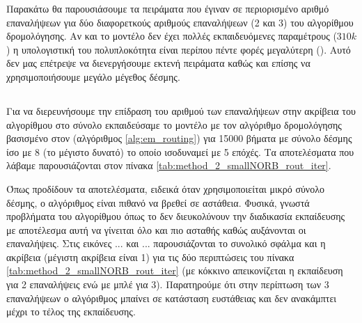 Παρακάτω θα παρουσιάσουμε τα πειράματα που έγιναν σε περιορισμένο αριθμό επαναλήψεων για δύο διαφορετκούς αριθμούς επαναλήψεων (2 και 3) του αλγορίθμου δρομολόγησης. Αν και το μοντέλο δεν έχει πολλές εκπαιδευόμενες παραμέτρους ($310k$) η υπολογιστική του πολυπλοκότητα είναι περίπου πέντε φορές μεγαλύτερη (). Αυτό δεν μας επέτρεψε να διενεργήσουμε εκτενή πειράματα καθώς και επίσης να χρησιμοποιήσουμε μεγάλο μέγεθος δέσμης.

\subsection{}
Για να διερευνήσουμε την επίδραση του αριθμού των επαναλήψεων στην ακρίβεια του αλγορίθμου στο σύνολο  εκπαιδεύσαμε το μοντέλο με τον αλγόριθμο δρομολόγησης βασισμένο στον  (αλγόριθμος \ref{alg:em_routing}) για 15000 βήματα με σύνολο δέσμης ίσο με 8 (το μέγιστο δυνατό) το οποίο ισοδυναμεί με 5 επόχές. Τα αποτελέσματα που λάβαμε παρουσιάζονται στον πίνακα \ref{tab:method_2_smallNORB_rout_iter}.
\begin{table}[h]
    \begin{center}
    \end{center}
    \caption[]{\label{tab:method_2_smallNORB_rout_iter}Πίνακας στον οποίο φαίνεται η επίδραση του αριθμού των επαναλήψεων στην ακρίβεια όπως μετράται από το σύνολο ελέγχου , όταν χρησιμοποιούνται πολύ λίγες εποχές για την εκπαίδευση του μοντέλου.} 
\end{table}

Όπως προδίδουν τα αποτελέσματα, ειδεικά όταν χρησιμοποιείται μικρό σύνολο δέσμης, ο αλγόριθμος είναι πιθανό να βρεθεί σε αστάθεια. Φυσικά, γνωστά προβλήματα του αλγορίθμου  όπως το  δεν διευκολύνουν την διαδικασία εκπαίδευσης με αποτέλεσμα αυτή να γίνειται όλο και πιο ασταθής καθώς αυξάνονται οι επαναλήψεις. Στις εικόνες ... και ... παρουσιάζονται το συνολικό σφάλμα και η ακρίβεια (μέγιστη ακρίβεια είναι 1) για τις δύο περιπτώσεις του πίνακα \ref{tab:method_2_smallNORB_rout_iter} (με κόκκινο απεικονίζεται η εκπαίδευση για 2 επαναλήψεις ενώ με μπλέ για 3). Παρατηρούμε ότι στην περίπτωση των 3 επαναλήψεων ο αλγόριθμος μπαίνει σε κατάσταση ευστάθειας και δεν ανακάμπτει μέχρι το τέλος της εκπαίδευσης.


